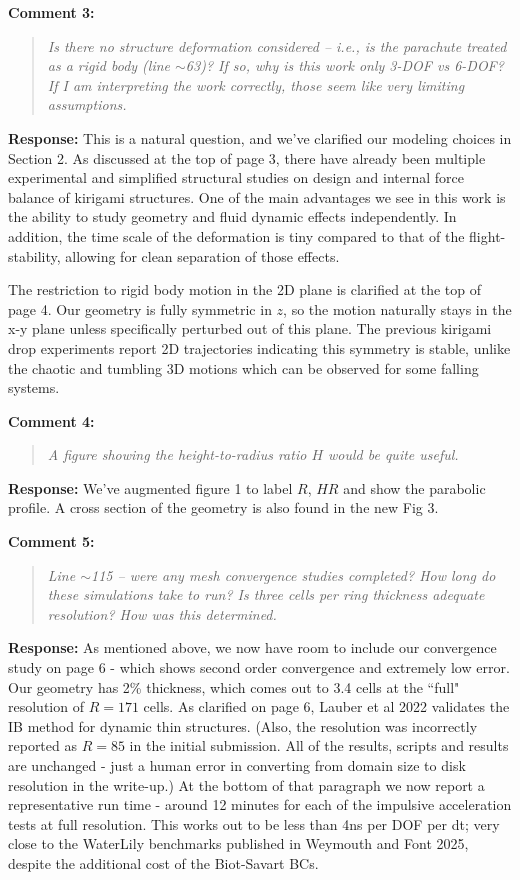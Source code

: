 \documentclass[11pt]{article}
\newenvironment{comment}[1]{\vspace{4mm}\par\noindent\textbf{Comment #1:}\begin{quote}\itshape}{\end{quote}}
\newcommand{\response}[1]{\par\noindent\textbf{Response:} #1}
\begin{document}
\begin{comment}{3}
Is there no structure deformation considered -- i.e., is the parachute treated as a
rigid body (line $\sim$63)? If so, why is this work only 3-DOF vs 6-DOF? If I am
interpreting the work correctly, those seem like very limiting assumptions.
\end{comment}
\response{}
This is a natural question, and we've clarified our modeling choices in Section 2. As discussed at the top of page 3, there have already been multiple experimental and simplified structural studies on design and internal force balance of kirigami structures. One of the main advantages we see in this work is the ability to study geometry and fluid dynamic effects independently. In addition, the time scale of the deformation is tiny compared to that of the flight-stability, allowing for clean separation of those effects. 

The restriction to rigid body motion in the 2D plane is clarified at the top of page 4. Our geometry is fully symmetric in $z$, so the motion naturally stays in the x-y plane unless specifically perturbed out of this plane. The previous kirigami drop experiments report 2D trajectories indicating this symmetry is stable, unlike the chaotic and tumbling 3D motions which can be observed for some falling systems.

\begin{comment}4
A figure showing the height-to-radius ratio $H$ would be quite useful.
\end{comment}
\response{}
We've augmented figure 1 to label $R$, $HR$ and show the parabolic profile. A cross section of the geometry is also found in the new Fig 3. 

\begin{comment}5
Line $\sim$115 -- were any mesh convergence studies completed? How long do these
simulations take to run? Is three cells per ring thickness adequate resolution? How was this determined.
\end{comment}
\response{}
As mentioned above, we now have room to include our convergence study on page 6 - which shows second order convergence and extremely low error. Our geometry has 2\% thickness, which comes out to 3.4 cells at the ``full" resolution of $R=171$ cells. As clarified on page 6, Lauber et al 2022 validates the IB method for dynamic thin structures. (Also, the resolution was incorrectly reported as $R=85$ in the initial submission. All of the results, scripts and results are unchanged - just a human error in converting from domain size to disk resolution in the write-up.) At the bottom of that paragraph we now report a representative run time - around 12 minutes for each of the impulsive acceleration tests at full resolution. This works out to be less than 4ns per DOF per dt; very close to the WaterLily benchmarks published in Weymouth and Font 2025, despite the additional cost of the Biot-Savart BCs.
\end{document}
